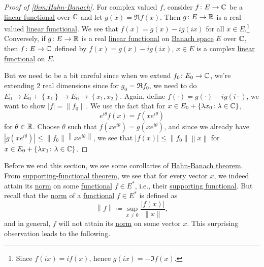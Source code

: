 \begin{proof}[Proof of \autoref{thm:Hahn-Banach}]
	For complex valued \(f\), consider \(f\colon E\to \mathbb{\MakeUppercase{c}} \) be a \hyperref[def:linear-functional]{linear functional} over \(\mathbb{\MakeUppercase{c}} \) and let \(g(x) = \Re f(x)\). Then \(g\colon E\to \mathbb{\MakeUppercase{r}} \) is a real-valued \hyperref[def:linear-functional]{linear functional}. We see that \(f(x) = g(x) - ig(ix)\) for all \(x\in E\).\footnote{Since \(f(ix) = if(x)\), hence \(g(ix) = -\Im f(x)\).} Conversely, if \(g\colon E\to \mathbb{\MakeUppercase{r}} \) is a real \hyperref[def:linear-functional]{linear functional} on \hyperref[def:Banach-space]{Banach space} \(E\) over \(\mathbb{\MakeUppercase{c}} \), then \(f\colon E\to \mathbb{\MakeUppercase{c}} \) defined by \(f(x) = g(x) - ig(ix)\), \(x\in E\) is a complex \hyperref[def:linear-functional]{linear functional} on \(E\).

	But we need to be a bit careful since when we extend \(f_0 \colon E_0 \to \mathbb{\MakeUppercase{c}} \), we're extending \(2\) real dimensions since for \(g_0 = \Re f_0\), we need to do \(E_0 \to E_0 + \left\{ x_1 \right\} \to E_0 \to \left\{ x_1, x_2 \right\} \). Again, define \(f(\cdot) = g(\cdot) - ig(i\cdot)\), we want to show \(\left\vert f \right\vert = \left\lVert f_0\right\rVert \). We use the fact that for \(x\in E_{0} + \left\{ \lambda x_0\colon \lambda \in \mathbb{\MakeUppercase{c}}  \right\}\),
	\[
		e^{i \theta }f(x) = f(x e^{i \theta })
	\]
	for \(\theta \in \mathbb{\MakeUppercase{r}} \). Choose \(\theta \) such that \(f(x e^{i \theta }) = g(x e^{i \theta })\), and since we already have \(\left\vert g(xe^{i \theta }) \right\vert \leq \left\lVert f_0\right\rVert \left\lVert x e^{i \theta }\right\rVert \), we see that \(\left\vert f(x) \right\vert \leq \left\lVert f_0\right\rVert \left\lVert x\right\rVert \) for \(x\in E_0 + \left\{ \lambda x_1 \colon \lambda \in \mathbb{\MakeUppercase{c}}  \right\} \).
\end{proof}

Before we end this section, we see some corollaries of \hyperref[thm:Hahn-Banach]{Hahn-Banach theorem}. From \hyperref[thm:supporting-functional]{supporting-functional theorem}, we see that for every vector \(x\), we indeed attain its \hyperref[def:norm]{norm} on some \hyperref[def:linear-functional]{functional} \(f\in E^{\ast} \), i.e., their \hyperref[thm:supporting-functional]{supporting functional}. But recall that the \hyperref[def:norm]{norm} of a \hyperref[def:linear-functional]{functional} \(f\in E^{\ast} \) is defined as
\[
	\left\lVert f\right\rVert \coloneqq \sup _{x \neq 0}\frac{\left\vert f(x) \right\vert }{\left\lVert x\right\rVert },
\]
and in general, \(f\) will not attain its \hyperref[def:norm]{norm} on some vector \(x\). This surprising observation leads to the following.

